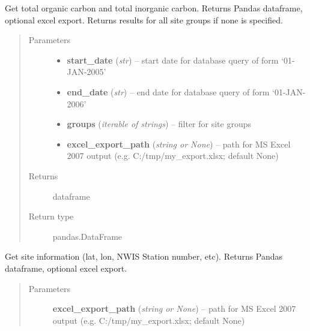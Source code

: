 \documentclass[letterpaper,10pt,english]{sphinxmanual}
\begin{document}
\begin{fulllineitems}
\begin{fulllineitems}
\label{modules:webb_utils.retrieve_data.RetrieveData.get_piezo_sites}
Get total organic carbon and total inorganic carbon.
Returns Pandas dataframe, optional excel export.
Returns results for all site groups if none is specified.
\begin{quote}\begin{description}
\item[{Parameters}] \leavevmode\begin{itemize}
\item {} 
\textbf{start\_date} (\emph{str}) -- start date for database query of form `01-JAN-2005'

\item {} 
\textbf{end\_date} (\emph{str}) -- end date for database query of form `01-JAN-2006'

\item {} 
\textbf{groups} (\emph{iterable of strings}) -- filter for site groups

\item {} 
\textbf{excel\_export\_path} (\emph{string or None}) -- path for MS Excel 2007 output (e.g. C:/tmp/my\_export.xlsx; default None)

\end{itemize}

\item[{Returns}] \leavevmode
dataframe

\item[{Return type}] \leavevmode
pandas.DataFrame

\end{description}\end{quote}

\end{fulllineitems}


\begin{fulllineitems}
\label{modules:webb_utils.retrieve_data.RetrieveData.get_site_info}
Get site information (lat, lon, NWIS Station number, etc).
Returns Pandas dataframe, optional excel export.
\begin{quote}\begin{description}
\item[{Parameters}] \leavevmode
\textbf{excel\_export\_path} (\emph{string or None}) -- path for MS Excel 2007 output (e.g. C:/tmp/my\_export.xlsx; default None)


\end{description}
\end{quote}
\end{fulllineitems}
\end{fulllineitems}
\end{document}
